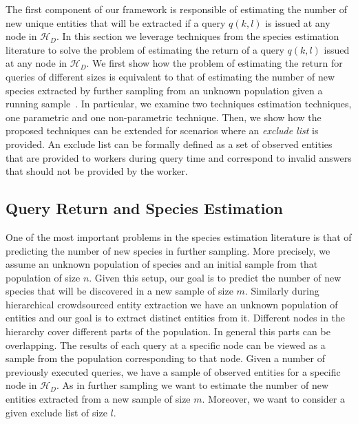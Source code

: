 \documentclass{vldb}
\newcommand{\hierarchy}{\mathcal{H}_D}
\begin{document}
The first component of our framework is responsible of estimating the number of new unique entities that will be extracted if a query $q(k,l)$ is issued at any node in $\hierarchy$.  
In this section we leverage techniques from the species estimation literature to solve the problem of estimating the return of a query $q(k,l)$ issued at any node in $\hierarchy$. We first show how the problem of estimating the return for queries of different sizes is equivalent to that of estimating the number of new species extracted by further sampling from an unknown population given a running sample~\cite{shen:2003}. In particular, we examine two techniques estimation techniques, one parametric and one non-parametric technique. Then, we show how the proposed techniques can be extended for scenarios where an {\em exclude list} is provided. An exclude list can be formally defined as a set of observed entities that are provided to workers during query time and correspond to invalid answers that should not be provided by the worker. 

\subsection{Query Return and Species Estimation}
One of the most important problems in the species estimation literature is that of predicting the number of new species in further sampling. More precisely, we assume an unknown population of species and an initial sample from that population of size $n$. Given this setup, our goal is to predict the number of new species that will be discovered in a new sample of size $m$. Similarly during hierarchical crowdsourced entity extraction we have an unknown population of entities and our goal is to extract distinct entities from it. Different nodes in the hierarchy cover different parts of the population. In general this parts can be overlapping. The results of each query at a specific node can be viewed as a sample from the population corresponding to that node. Given a number of previously executed queries, we have a sample of observed entities for a specific node in $\hierarchy$. As in further sampling we want to estimate the number of new entities extracted from a new sample of size $m$. Moreover, we want to consider a given exclude list of size $l$.
\end{document}

